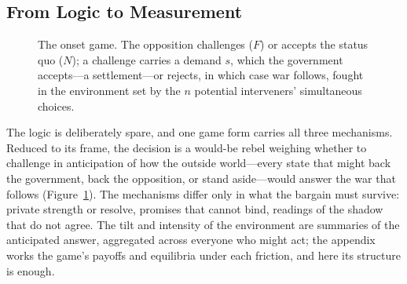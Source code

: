 \subsection{From Logic to Measurement}

\begin{figure}[t]
  \centering
  \caption{The onset game.  The opposition challenges ($F$) or accepts the
    status quo ($N$); a challenge carries a demand $s$, which the government
    accepts---a settlement---or rejects, in which case war follows, fought in
    the environment set by the $n$ potential interveners' simultaneous
    choices.}
  \label{fig:ntree}
\end{figure}

The logic is deliberately spare, and one game form carries all three
mechanisms.  Reduced to its frame, the decision is a would-be rebel weighing
whether to challenge in anticipation of how the outside world---every state
that might back the government, back the opposition, or stand aside---would
answer the war that follows (Figure~\ref{fig:ntree}).  The mechanisms differ
only in what the bargain must survive: private strength or resolve, promises
that cannot bind, readings of the shadow that do not agree.  The tilt and intensity of
the environment are summaries of the anticipated answer, aggregated across
everyone who might act; the appendix works the game's payoffs and equilibria
under each friction, and here its structure is enough.

